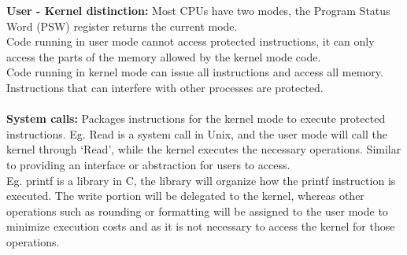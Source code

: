 \documentclass[a4paper,10pt]{article}
\begin{document}
\textcolor{WildStrawberry}{\textbf{User - Kernel distinction:}} Most CPUs have two modes, the Program Status Word (PSW) register returns the current mode.\\
Code running in user mode cannot access protected instructions, it can only access the parts of the memory allowed by the kernel mode code. \\
Code running in kernel mode can issue all instructions and access all memory. Instructions that can interfere with other processes are protected. \\\\
\textcolor{WildStrawberry}{\textbf{System calls:}} Packages instructions for the kernel mode to execute protected instructions. Eg. Read is a system call in Unix, and the user mode will call the kernel through `Read', while the kernel executes the necessary operations. Similar to providing an interface or abstraction for users to access. \\
Eg. printf is a library in C, the library will organize how the printf instruction is executed. The write portion will be delegated to the kernel, whereas other operations such as rounding or formatting will be assigned to the user mode to minimize execution costs and as it is not necessary to access the kernel for those operations.
\end{document}
